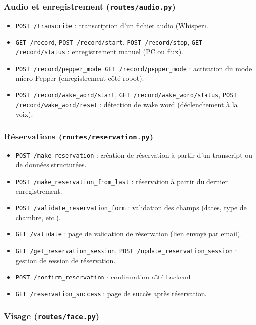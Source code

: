 \documentclass[12pt,a4paper]{article}
\begin{document}
\subsubsection{Audio et enregistrement (\texttt{routes/audio.py})}

\begin{itemize}[noitemsep]
  \item \texttt{POST /transcribe} : transcription d'un fichier audio (Whisper).
  \item \texttt{GET /record}, \texttt{POST /record/start}, \texttt{POST /record/stop}, \texttt{GET /record/status} : enregistrement manuel (PC ou flux).
  \item \texttt{POST /record/pepper\_mode}, \texttt{GET /record/pepper\_mode} : activation du mode micro Pepper (enregistrement côté robot).
  \item \texttt{POST /record/wake\_word/start}, \texttt{GET /record/wake\_word/status}, \texttt{POST /record/wake\_word/reset} : détection de wake word (déclenchement à la voix).
\end{itemize}

\subsubsection{Réservations (\texttt{routes/reservation.py})}

\begin{itemize}[noitemsep]
  \item \texttt{POST /make\_reservation} : création de réservation à partir d'un transcript ou de données structurées.
  \item \texttt{POST /make\_reservation\_from\_last} : réservation à partir du dernier enregistrement.
  \item \texttt{POST /validate\_reservation\_form} : validation des champs (dates, type de chambre, etc.).
  \item \texttt{GET /validate} : page de validation de réservation (lien envoyé par email).
  \item \texttt{GET /get\_reservation\_session}, \texttt{POST /update\_reservation\_session} : gestion de session de réservation.
  \item \texttt{POST /confirm\_reservation} : confirmation côté backend.
  \item \texttt{GET /reservation\_success} : page de succès après réservation.
\end{itemize}

\subsubsection{Visage (\texttt{routes/face.py})}
\end{document}
